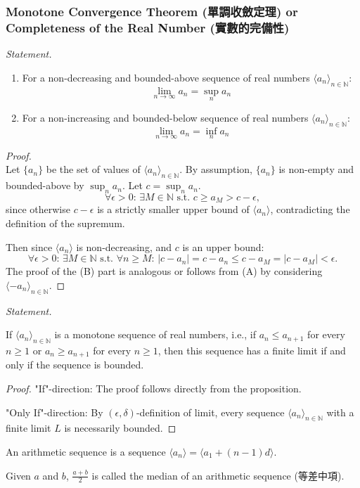 \documentclass[a4paper,12pt]{report}
\begin{document}
\subsubsection{Monotone Convergence Theorem (單調收斂定理) or Completeness of the Real Number (實數的完備性)}
\textit{Statement.}
\begin{enumerate}[label=(\Alph*)]
\item For a non-decreasing and bounded-above sequence of real numbers $\langle a_n\rangle_{n\in\mathbb {N}}$:
\[\lim_{n\to\infty}a_n=\sup_n a_n\]
\item For a non-increasing and bounded-below sequence of real numbers $\langle a_n\rangle_{n\in\mathbb {N}}$:
\[\lim_{n\to\infty}a_n=\inf_n a_n\]
\end{enumerate}
\begin{proof}\mbox{}\\
Let $\{a_{n}\}$ be the set of values of $\langle a_n\rangle_{n\in\mathbb {N}}$. By assumption, $\{a_n\}$ is non-empty and bounded-above by $\sup_n a_n$. Let $c=\sup_n a_n$.
\[\forall\epsilon>0:\,\exists M\in\mathbb {N}\text{\ s.t.\ }c\geq a_M>c-\epsilon,\]
since otherwise $c-\epsilon$ is a strictly smaller upper bound of $\langle a_n\rangle$, contradicting the definition of the supremum. 

Then since $\langle a_n\rangle$ is non-decreasing, and $c$ is an upper bound:
\[\forall\epsilon>0:\,\exists M\in\mathbb {N}\text{\ s.t.\ }\forall n\geq M:\,|c-a_n|=c-a_n\leq c-a_M=|c-a_M|<\epsilon.\]
The proof of the (B) part is analogous or follows from (A) by considering $\langle -a_{n}\rangle_{n\in \mathbb{N}}$.
\end{proof}
\textit{Statement.}

If $\langle a_n\rangle_{n\in\mathbb {N}}$ is a monotone sequence of real numbers, i.e., if 
$a_n\leq a_{n+1}$ for every $n\geq 1$ or $a_n\geq a_{n+1}$ for every $n\geq 1$, then this sequence has a finite limit if and only if the sequence is bounded.
\begin{proof}
"If"-direction: The proof follows directly from the proposition.

"Only If"-direction: By $(\epsilon,\delta)$-definition of limit, every sequence $\langle a_n\rangle_{n\in\mathbb {N}}$ with a finite limit $L$ is necessarily bounded.
\end{proof}
An arithmetic sequence is a sequence $\langle a_n\rangle=\langle a_1+(n-1)d\rangle$. 

Given $a$ and $b$, $\frac{a+b}{2}$ is called the median of an arithmetic sequence (等差中項).
\end{document}
